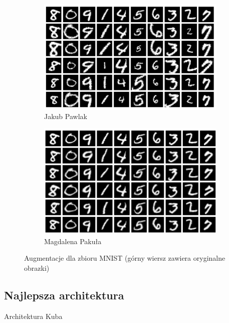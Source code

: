 \documentclass[10pt]{article}
\begin{document}
\begin{figure}[H]\centering
    \begin{subfigure}[t]{.45\textwidth}
        \centering
        \includegraphics[width=.7\linewidth]{img/kuba/mnist/augmentations.png}
        \caption{Jakub Pawlak}
    \end{subfigure}
    \begin{subfigure}[t]{.45\textwidth}
        \centering
        \includegraphics[width=0.7\linewidth]{img/magda/augmented_MNIST}
        \caption{Magdalena Pakuła}
    \end{subfigure}
    \caption{Augmentacje dla zbioru MNIST (górny wiersz zawiera oryginalne obrazki)}
\end{figure}


\subsection*{Najlepsza architektura}

Architektura Kuba
\end{document}
